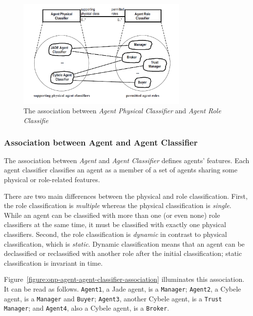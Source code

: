 \begin{figure}[ht]
	\centering
	\includegraphics[width=0.75\textwidth]{images/onp/physical-classifier-role-classifier-association.png}
	\caption{The association between \textit{Agent Physical Classifier} and \textit{Agent Role Classifie}}
	\label{figure:onp-physical-classifier-role-classifier-association}
\end{figure}

\subsubsection*{Association between Agent and Agent Classifier}

The association between \textit{Agent} and \textit{Agent Classifier} defines agents' features.
Each agent classifier classifies an agent as a member of a set of agents sharing some physical or role-related features.

There are two main differences between the physical and role classification. First, the role classification is \textit{multiple} whereas the physical classification is \textit{single}.
While an agent can be classified with more than one (or even none) role classifiers at the same time, it must be classified with exactly one physical classifiers.
Second, the role classification is \textit{dynamic} in contrast to physical classification, which is \textit{static}.
Dynamic classification means that an agent can be declassified or reclassified with another role after the initial classification; static classification is invariant in time.

Figure~\ref{figure:onp-agent-agent-classifier-association} illuminates this association.
It can be read as follows. \texttt{Agent1}, a Jade agent, is a \texttt{Manager}; \texttt{Agent2}, a Cybele agent, is a \texttt{Manager} and \texttt{Buyer}; \texttt{Agent3}, another Cybele agent, is a \texttt{Trust Manager}; and \texttt{Agent4}, also a Cybele agent, is a \texttt{Broker}.

